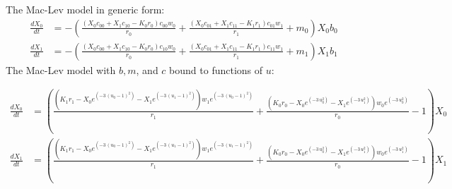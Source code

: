 \documentclass{article}
\begin{document}
The Mac-Lev model in generic form: 
\[\begin{align*}
\frac{dX_{0}}{dt} &= -{\left(\frac{{\left(X_{0} c_{00} + X_{1} c_{10} - K_{0} r_{0}\right)} c_{00} w_{0}}{r_{0}} + \frac{{\left(X_{0} c_{01} + X_{1} c_{11} - K_{1} r_{1}\right)} c_{01} w_{1}}{r_{1}} + m_{0}\right)} X_{0} b_{0}\\
\frac{dX_{1}}{dt} &= -{\left(\frac{{\left(X_{0} c_{00} + X_{1} c_{10} - K_{0} r_{0}\right)} c_{10} w_{0}}{r_{0}} + \frac{{\left(X_{0} c_{01} + X_{1} c_{11} - K_{1} r_{1}\right)} c_{11} w_{1}}{r_{1}} + m_{1}\right)} X_{1} b_{1}
\end{align*}\]
The Mac-Lev model with $b, m$, and $c$ bound to functions of $u$:

\[\begin{align*}
\frac{dX_{0}}{dt} &= {\left(\frac{{\left(K_{1} r_{1} - X_{0} e^{\left(-3 \, {\left(u_{0} - 1\right)}^{2}\right)} - X_{1} e^{\left(-3 \, {\left(u_{1} - 1\right)}^{2}\right)}\right)} w_{1} e^{\left(-3 \, {\left(u_{0} - 1\right)}^{2}\right)}}{r_{1}} + \frac{{\left(K_{0} r_{0} - X_{0} e^{\left(-3 \, u_{0}^{2}\right)} - X_{1} e^{\left(-3 \, u_{1}^{2}\right)}\right)} w_{0} e^{\left(-3 \, u_{0}^{2}\right)}}{r_{0}} - 1\right)} X_{0}\\
\frac{dX_{1}}{dt} &= {\left(\frac{{\left(K_{1} r_{1} - X_{0} e^{\left(-3 \, {\left(u_{0} - 1\right)}^{2}\right)} - X_{1} e^{\left(-3 \, {\left(u_{1} - 1\right)}^{2}\right)}\right)} w_{1} e^{\left(-3 \, {\left(u_{1} - 1\right)}^{2}\right)}}{r_{1}} + \frac{{\left(K_{0} r_{0} - X_{0} e^{\left(-3 \, u_{0}^{2}\right)} - X_{1} e^{\left(-3 \, u_{1}^{2}\right)}\right)} w_{0} e^{\left(-3 \, u_{1}^{2}\right)}}{r_{0}} - 1\right)} X_{1}
\end{align*}\]
\end{document}
